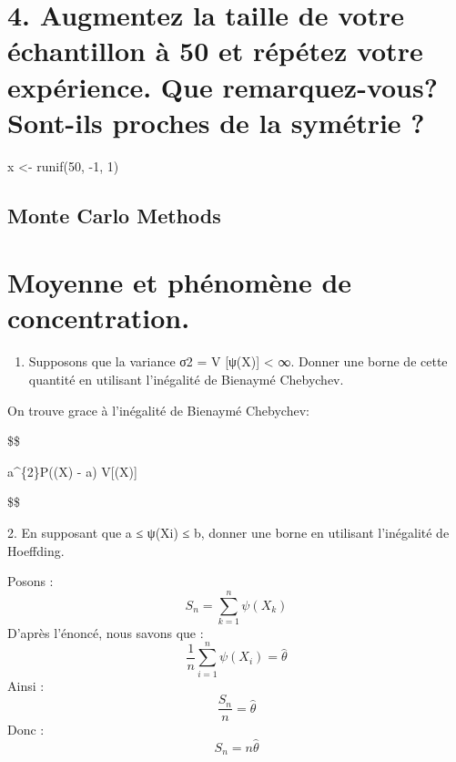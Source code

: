 \documentclass[
]{article}
\newenvironment{Shaded}{\begin{snugshade}}{\end{snugshade}}
\newcommand{\DecValTok}[1]{\textcolor[rgb]{0.00,0.00,0.81}{#1}}
\newcommand{\FunctionTok}[1]{\textcolor[rgb]{0.00,0.00,0.00}{#1}}
\newcommand{\NormalTok}[1]{#1}
\newcommand{\OtherTok}[1]{\textcolor[rgb]{0.56,0.35,0.01}{#1}}
\newcommand{\SpecialCharTok}[1]{\textcolor[rgb]{0.00,0.00,0.00}{#1}}
\providecommand{\tightlist}{%
  \setlength{\itemsep}{0pt}\setlength{\parskip}{0pt}}
\begin{document}
\hypertarget{augmentez-la-taille-de-votre-uxe9chantillon-uxe0-50-et-ruxe9puxe9tez-votre-expuxe9rience.-que-remarquez-vous-sont-ils-proches-de-la-symuxe9trie}{%
\section{4. Augmentez la taille de votre échantillon à 50 et répétez
votre expérience. Que remarquez-vous? Sont-ils proches de la symétrie
?}\label{augmentez-la-taille-de-votre-uxe9chantillon-uxe0-50-et-ruxe9puxe9tez-votre-expuxe9rience.-que-remarquez-vous-sont-ils-proches-de-la-symuxe9trie}}

\begin{Shaded}
\begin{Highlighting}[]
\NormalTok{x }\OtherTok{\textless{}{-}} \FunctionTok{runif}\NormalTok{(}\DecValTok{50}\NormalTok{, }\SpecialCharTok{{-}}\DecValTok{1}\NormalTok{, }\DecValTok{1}\NormalTok{)}
\end{Highlighting}
\end{Shaded}

\hypertarget{monte-carlo-methods}{%
\subsection{Monte Carlo Methods}\label{monte-carlo-methods}}

\hypertarget{moyenne-et-phuxe9nomuxe8ne-de-concentration.}{%
\section{Moyenne et phénomène de
concentration.}\label{moyenne-et-phuxe9nomuxe8ne-de-concentration.}}

\begin{enumerate}
\def\labelenumi{\arabic{enumi}.}
\tightlist
\item
  Supposons que la variance σ2 = V {[}ψ(X){]} \textless{} ∞. Donner une
  borne de cette quantité en utilisant l'inégalité de Bienaymé
  Chebychev.
\end{enumerate}

On trouve grace à l'inégalité de Bienaymé Chebychev:

\$\$

a\^{}\{2\}P(\textbar{}\psi(X) - \theta\textbar{} \ge a)
\le V{[}\psi(X){]}

\$\$

2. En supposant que a ≤ ψ(Xi) ≤ b, donner une borne en utilisant
l'inégalité de Hoeffding.

Posons : \[
S_{n} = \sum_{k=1}^n \psi(X_k)
\] D'après l'énoncé, nous savons que : \[
\frac{1}{n} \sum_{i=1}^n \psi(X_i) = \hat{\theta}
\] Ainsi : \[
\frac{S_n}{n} = \hat{\theta} 
\] Donc : \[
S_n=n\hat{\theta}
\]
\end{document}
